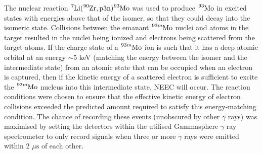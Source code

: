 \documentclass[12pt,a4paper]{article}
\begin{document}

The nuclear reaction $\ce{^{7}Li}(\ce{^{90}Zr},\text{p}3\text{n})\ce{^{93}Mo}$ was used to produce $\ce{^{93}Mo}$ in excited states with energies above that of the isomer, so that they could decay into the isomeric state. Collisions between the emanant $\ce{^{93m}Mo}$ nuclei and atoms in the target resulted in the nuclei being ionized and electrons being scattered from the target atoms. 
If the charge state of a $\ce{^{93m}Mo}$ ion is such that it has a deep atomic orbital at an energy $\sim$5 keV (matching the energy between the isomer and the intermediate state) from an atomic state that can be occupied when an electron is captured, then if the kinetic energy of a scattered electron is sufficient to excite the $\ce{^{93m}Mo}$ nucleus into this intermediate state, NEEC will occur. The reaction conditions were chosen to ensure that the effective kinetic energy of electron collisions exceeded the predicted amount required to satisfy this energy-matching condition. The chance of recording these events (unobscured by other $\gamma$ rays) was maximised by setting the detectors within the utilised Gammasphere $\gamma$ ray spectrometer to only record signals when three or more $\gamma$ rays were emitted within 2 $\mu \text{s}$ of each other.
\end{document}
